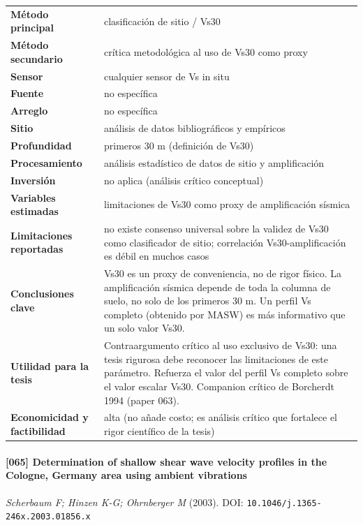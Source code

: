 \begin{center}\scriptsize
\begin{tabularx}{\textwidth}{@{}>{\bfseries}p{3.3cm} X@{}}
\toprule
M\'etodo principal & clasificación de sitio / Vs30 \\
M\'etodo secundario & crítica metodológica al uso de Vs30 como proxy \\
Sensor & cualquier sensor de Vs in situ \\
Fuente & no específica \\
Arreglo & no específica \\
Sitio & análisis de datos bibliográficos y empíricos \\
Profundidad & primeros 30 m (definición de Vs30) \\
Procesamiento & análisis estadístico de datos de sitio y amplificación \\
Inversi\'on & no aplica (análisis crítico conceptual) \\
Variables estimadas & limitaciones de Vs30 como proxy de amplificación sísmica \\
Limitaciones reportadas & no existe consenso universal sobre la validez de Vs30 como clasificador de sitio; correlación Vs30-amplificación es débil en muchos casos \\
Conclusiones clave & Vs30 es un proxy de conveniencia, no de rigor físico. La amplificación sísmica depende de toda la columna de suelo, no solo de los primeros 30 m. Un perfil Vs completo (obtenido por MASW) es más informativo que un solo valor Vs30. \\
Utilidad para la tesis & Contraargumento crítico al uso exclusivo de Vs30: una tesis rigurosa debe reconocer las limitaciones de este parámetro. Refuerza el valor del perfil Vs completo sobre el valor escalar Vs30. Companion crítico de Borcherdt 1994 (paper 063). \\
Economicidad y factibilidad & alta (no añade costo; es análisis crítico que fortalece el rigor científico de la tesis) \\
\bottomrule
\end{tabularx}
\end{center}

\paragraph{[065] Determination of shallow shear wave velocity profiles in the Cologne, Germany area using ambient vibrations} \emph{Scherbaum F; Hinzen K-G; Ohrnberger M} (2003).
{\scriptsize DOI: \texttt{10.1046/j.1365-246x.2003.01856.x}}

